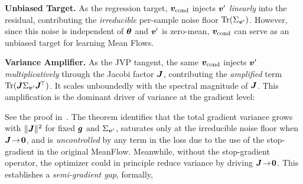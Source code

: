 \noindent\textbf{Unbiased Target.} As the regression target, ${\bm{v}}_{\text{cond}}$ injects ${\bm{v}}^{\prime}$ \textit{linearly} into the residual, contributing the \emph{irreducible} per-sample noise floor $\operatorname{Tr}(\Sigma_{{\bm{v}}^{\prime}})$. However, since this noise is independent of ${\bm{\theta}}$ and ${\bm{v}}^{\prime}$ is zero-mean, ${\bm{v}}_{\text{cond}}$ can serve as an unbiased target for learning Mean Flows.

\noindent\textbf{Variance Amplifier.} As the JVP tangent, the same ${\bm{v}}_{\text{cond}}$ injects ${\bm{v}}^{\prime}$ \textit{multiplicatively} through the Jacobi factor ${\bm{J}}$, contributing the \emph{amplified} term $\operatorname{Tr}({\bm{J}}\Sigma_{{\bm{v}}^{\prime}}{\bm{J}}^{\!\top})$. It scales unboundedly with the spectral magnitude of ${\bm{J}}$. This amplification is the dominant driver of variance at the gradient level:


See the proof in~. The theorem identifies that the total gradient variance grows with $\|{\bm{J}}\|^{2}$ for fixed ${\bm{g}}$ and $\Sigma_{{\bm{v}}^{\prime}}$, saturates only at the irreducible noise floor when ${\bm{J}}\!\to\!\bm{0}$, and is \emph{uncontrolled} by any term in the loss due to the use of the stop-gradient in the original MeanFlow. Meanwhile, without the stop-gradient operator, the optimizer could in principle reduce variance by driving ${\bm{J}}\!\to\!\bm{0}$. This establishes a \textit{semi-gradient gap}, formally,


